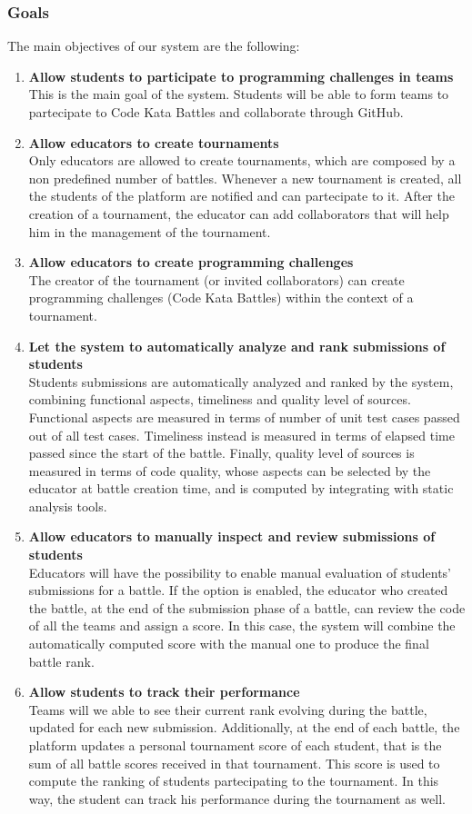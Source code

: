  \subsubsection{Goals}
 \label{goals}
 The main objectives of our system are the following:
 \begin{enumerate}[label=$\bullet$ \textbf{G\arabic*:}]
     \item \textbf{ Allow students to participate to programming challenges in teams}\\This is the main goal of the system. Students will be able to form teams to partecipate to Code Kata Battles and collaborate through GitHub.
     \item \textbf{ Allow educators to create tournaments}\\Only educators are allowed to create tournaments, which are composed by a non predefined number of battles. Whenever a new tournament is created, all the students of the platform are notified and can partecipate to it. After the creation of a tournament, the educator can add collaborators that will help him in the management of the tournament.
     \item \textbf{ Allow educators to create programming challenges}\\The creator of the tournament (or invited collaborators) can create programming challenges (Code Kata Battles) within the context of a tournament.
     \item \textbf{ Let the system to automatically analyze and rank submissions of students}\\Students submissions are automatically analyzed and ranked by the system, combining functional aspects, timeliness and quality level of sources. Functional aspects are measured in terms of number of unit test cases passed out of all test cases. Timeliness instead is measured in terms of elapsed time passed since the start of the battle. Finally, quality level of sources is measured in terms of code quality, whose aspects can be selected by the educator at battle creation time, and is computed by integrating with static analysis tools.
     \item \textbf{ Allow educators to manually inspect and review submissions of students}\\Educators will have the possibility to enable manual evaluation of students' submissions for a battle. If the option is enabled, the educator who created the battle, at the end of the submission phase of a battle, can review the code of all the teams and assign a score. In this case, the system will combine the automatically computed score with the manual one to produce the final battle rank.
     \item \textbf{ Allow students to track their performance}\\Teams will we able to see their current rank evolving during the battle, updated for each new submission. Additionally, at the end of each battle, the platform updates a personal tournament score of each student, that is the sum of all battle scores received in that tournament. This score is used to compute the ranking of students partecipating to the tournament. In this way, the student can track his performance during the tournament as well.
 \end{enumerate}
